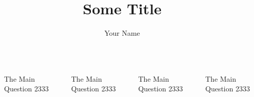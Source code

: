 \documentclass[final, notheorems]{beamer}
\title{Some Title}
\author{Your Name}
\institute[abbrv]{Department of XXX, XXX University}
\newlength{\sepwid}
\newlength{\onecolwid}
\begin{document}

\begin{frame}[t]
	\begin{columns}[t]
		\begin{column}{\sepwid}\end{column}			%
		\begin{column}{\onecolwid}
			\begin{alertblock}{The Main Question}
				2333
			\end{alertblock}
		\end{column}

		\begin{column}{\sepwid}\end{column}			%
		\begin{column}{\onecolwid}
			\begin{alertblock}{The Main Question}
				2333
			\end{alertblock}
		\end{column}

		\begin{column}{\sepwid}\end{column}			%
		\begin{column}{\onecolwid}
			\begin{alertblock}{The Main Question}
				2333
			\end{alertblock}
		\end{column}

		\begin{column}{\sepwid}\end{column}			%
		\begin{column}{\onecolwid}
			\begin{alertblock}{The Main Question}
				2333
			\end{alertblock}
		\end{column}

	\end{columns}
\end{frame}
\end{document}
